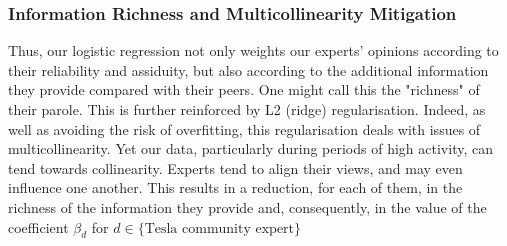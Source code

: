 \documentclass{article}
\begin{document}
\subsubsection{Information Richness and Multicollinearity Mitigation}
Thus, our logistic regression not only weights our experts’ opinions according to their reliability and assiduity, but also according to the additional information they provide compared with their peers. One might call this the "richness" of their parole. This is further reinforced by L2 (ridge) regularisation. Indeed, as well as avoiding the risk of overfitting, this regularisation deals with issues of multicollinearity. Yet our data, particularly during periods of high activity, can tend towards collinearity. Experts tend to align their views, and may even influence one another. This results in a reduction, for each of them, in the richness of the information they provide and, consequently, in the value of the coefficient $\beta_d$ for $d \in \{\text{Tesla community expert}\}$



\end{document}
